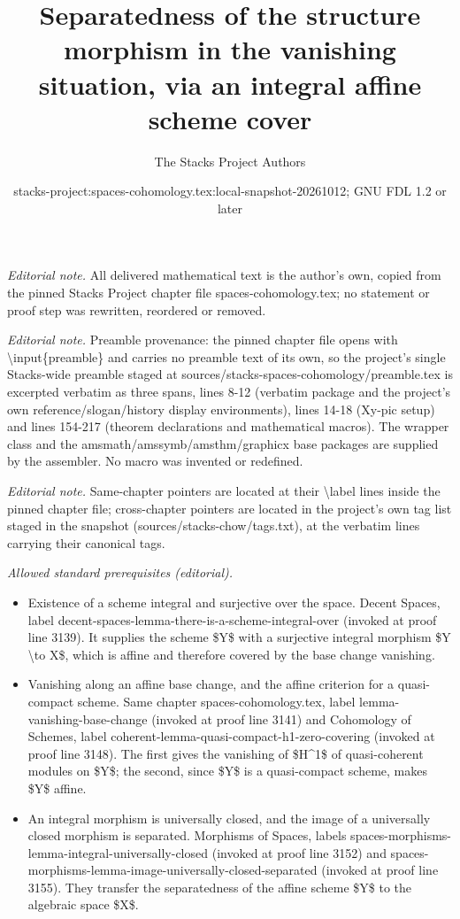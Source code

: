 \documentclass[10pt,a4paper]{amsart}
\title{Separatedness of the structure morphism in the vanishing situation, via an integral affine scheme cover}
\author{The Stacks Project Authors}
\date{stacks-project:spaces-cohomology.tex:local-snapshot-20261012; GNU FDL 1.2 or later}
\theoremstyle{plain}
\theoremstyle{definition}
\theoremstyle{remark}
\numberwithin{equation}{subsection}
\begin{document}
\maketitle
\noindent\textit{Editorial note.} All delivered mathematical text is the author's own, copied from the pinned Stacks Project chapter file spaces-cohomology.tex; no statement or proof step was rewritten, reordered or removed.\par\medskip
\noindent\textit{Editorial note.} Preamble provenance: the pinned chapter file opens with \textbackslash{}input\{preamble\} and carries no preamble text of its own, so the project's single Stacks-wide preamble staged at sources/stacks-spaces-cohomology/preamble.tex is excerpted verbatim as three spans, lines 8-12 (verbatim package and the project's own reference/slogan/history display environments), lines 14-18 (Xy-pic setup) and lines 154-217 (theorem declarations and mathematical macros). The wrapper class and the amsmath/amssymb/amsthm/graphicx base packages are supplied by the assembler. No macro was invented or redefined.\par\medskip
\noindent\textit{Editorial note.} Same-chapter pointers are located at their \textbackslash{}label lines inside the pinned chapter file; cross-chapter pointers are located in the project's own tag list staged in the snapshot (sources/stacks-chow/tags.txt), at the verbatim lines carrying their canonical tags.\par\medskip
\noindent\textit{Allowed standard prerequisites (editorial).}\begin{itemize}
\item Existence of a scheme integral and surjective over the space. Decent Spaces, label decent-spaces-lemma-there-is-a-scheme-integral-over (invoked at proof line 3139). It supplies the scheme \$Y\$ with a surjective integral morphism \$Y \textbackslash{}to X\$, which is affine and therefore covered by the base change vanishing.
\item Vanishing along an affine base change, and the affine criterion for a quasi-compact scheme. Same chapter spaces-cohomology.tex, label lemma-vanishing-base-change (invoked at proof line 3141) and Cohomology of Schemes, label coherent-lemma-quasi-compact-h1-zero-covering (invoked at proof line 3148). The first gives the vanishing of \$H\textasciicircum{}1\$ of quasi-coherent modules on \$Y\$; the second, since \$Y\$ is a quasi-compact scheme, makes \$Y\$ affine.
\item An integral morphism is universally closed, and the image of a universally closed morphism is separated. Morphisms of Spaces, labels spaces-morphisms-lemma-integral-universally-closed (invoked at proof line 3152) and spaces-morphisms-lemma-image-universally-closed-separated (invoked at proof line 3155). They transfer the separatedness of the affine scheme \$Y\$ to the algebraic space \$X\$.
\end{itemize}\medskip
\end{document}
